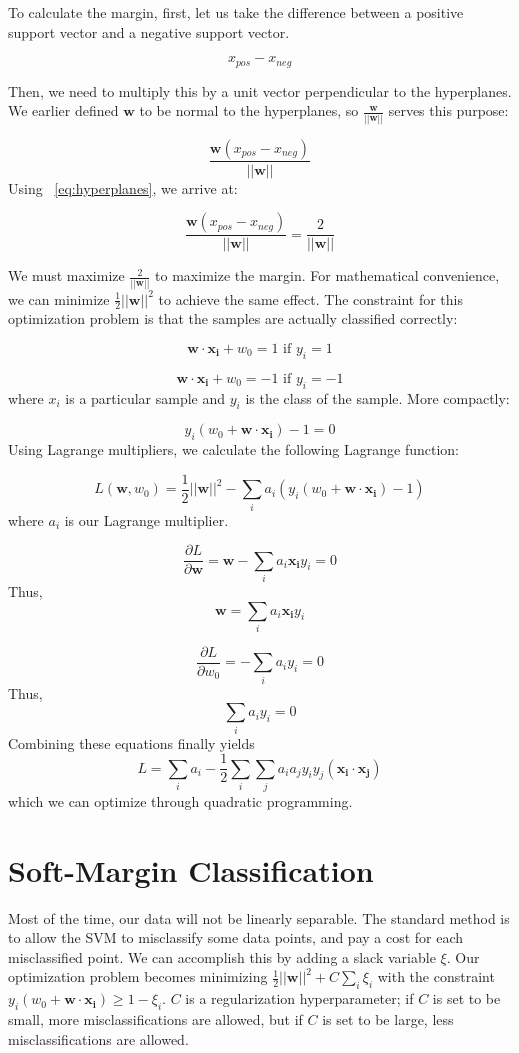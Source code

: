 \documentclass{article}
\begin{document}
To calculate the margin, first, let us take the difference between a positive support vector and a negative support vector.

\[ x_{pos} - x_{neg} \]

Then, we need to multiply this by a unit vector perpendicular to the hyperplanes. We earlier defined $\bm{w}$ to be normal to the hyperplanes, so $\frac{\bm{w}}{||\bm{w}||}$ serves this purpose:

\[ \frac{\bm{w}(x_{pos} - x_{neg})}{||\bm{w}||} \]
Using ~\ref{eq:hyperplanes}, we arrive at:

\[ \frac{\bm{w}(x_{pos} - x_{neg})}{||\bm{w}||} = \frac{2}{||\bm{w}||} \]

We must maximize $\frac{2}{||\bm{w}||}$ to maximize the margin. For mathematical convenience, we can minimize $\frac{1}{2}{||\bm{w}||^2}$ to achieve the same effect. The constraint for this optimization problem is that the samples are actually classified correctly:

\[ \bm{w \cdot x_{i}} + w_0 = 1 \text{ if $y_i = 1$} \]

\[ \bm{w \cdot x_{i}} + w_0 = -1 \text{ if $y_i = -1$}\]
where $x_i$ is a particular sample and $y_i$ is the class of the sample. More compactly:

\[ y_i(w_0 + \bm{w \cdot x_i}) - 1 = 0 \]
Using Lagrange multipliers, we  calculate the following Lagrange function:

\[ L(\bm{w}, w_0) = \frac{1}{2}{||\bm{w}||^2} - \sum_i{a_i(y_i(w_0 + \bm{w \cdot x_i}) - 1)}\]
where $a_i$ is our Lagrange multiplier.

\[ \frac{\partial L}{\partial \bm{w}} = \bm{w} - \sum_i{{a_i}{\bm{x_i}}{y_i}} = 0\]
Thus, 
\[ \bm{w} = \sum_i{{a_i}{\bm{x_i}}{y_i}} \]

\[ \frac{\partial L}{\partial w_0} = -\sum_i{{a_i}{y_i}} = 0\]
Thus,
\[ \sum_i{{a_i}{y_i}} = 0 \]
Combining these equations finally yields
\[ L = \sum_i{a_i}  - \frac{1}{2}{\sum_i{\sum_j{{a_i}{a_j}{y_i}{y_j}{(\bm{x_i \cdot x_j})}}}} \]
which we can optimize through quadratic programming.

\section{Soft-Margin Classification}
Most of the time, our data will not be linearly separable. The standard method is to allow the SVM to misclassify some data points, and pay a cost for each misclassified point. We can accomplish this by adding a slack variable $\xi$. Our optimization problem becomes minimizing $\frac{1}{2}{||\bm{w}||^2} + C\sum_i{{{\xi}_i}}$ with the constraint $y_i(w_0 + \bm{w \cdot x_i}) \geq 1 - {\xi}_i$. $C$ is a regularization hyperparameter; if $C$ is set to be small, more misclassifications are allowed, but if $C$ is set to be large, less misclassifications are allowed. 
\end{document}
